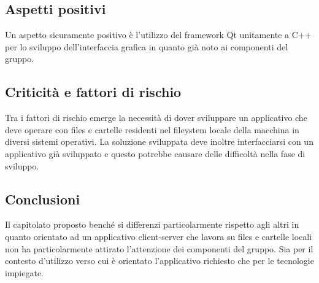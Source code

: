 \subsection{Aspetti positivi}
Un aspetto sicuramente positivo è l’utilizzo del framework Qt unitamente a C++  per lo sviluppo dell’interfaccia grafica in quanto già noto ai componenti del gruppo.


\subsection{Criticità e fattori di rischio}
Tra i fattori di rischio emerge la necessità di dover sviluppare un applicativo che deve operare con files e cartelle residenti nel fileystem locale della macchina in diversi sistemi operativi.
La soluzione sviluppata deve inoltre interfacciarsi con un applicativo già sviluppato e questo potrebbe causare delle difficoltà nella fase di sviluppo.

\subsection{Conclusioni}
Il capitolato proposto benché si differenzi particolarmente rispetto agli altri in quanto orientato ad un applicativo client-server che lavora su files e cartelle locali non ha particolarmente attirato l’attenzione dei componenti del gruppo. Sia per il contesto d'utilizzo verso cui è orientato l’applicativo richiesto che per le tecnologie impiegate.

\newpage
